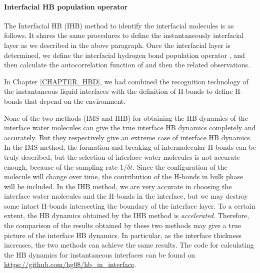 \paragraph{Interfacial HB population operator \hbos} 
The Interfacial HB (IHB) method to identify the interfacial molecules is as follows. 
It shares the same procedures to define the instantaneously interfacial layer as we described in the above paragraph.
Once the interfacial layer is determined, we define the interfacial hydrogen bond population operator \hbos,
and then calculate the autocorrelation function of \hbos and then the related observations. 

In Chapter \ref{CHAPTER_HBD}, we had combined the recognition technology of the instantaneous liquid interfaces\cite{Willard2010} 
with the definition of H-bonds\cite{AL96b,Luzar1996} to define H-bonds that depend on the environment. 

None of the two methods (IMS and IHB) for obtaining the HB dynamics of the interface water molecules 
can give the true interface HB dynamics completely and accurately. But they respectively give an extreme case of interface HB dynamics. 
In the IMS method, the formation and breaking of intermolecular H-bonds can be truly described, 
but the selection of interface water molecules is not accurate enough, because of the sampling rate $1/{\delta t}$. 
Since the configuration of the molecule will change over time, 
the contribution of the H-bonds in bulk phase will be included. 
In the IHB method, we are very accurate in choosing the interface water molecules and the H-bonds in the interface, 
but we may destroy some intact H-bonds intersecting the boundary of the interface layer. 
To a certain extent, the HB dynamics obtained by the IHB method is \emph{accelerated}. 
Therefore, the comparison of the results obtained by these two methods may give a true picture of the interface HB dynamics.
In particular, as the interface thickness increases, the two methods can achieve the same results.
The code for calculating the HB dynamics for instantaneous interfaces can be found on \url{https://github.com/hg08/hb_in_interface}. 
